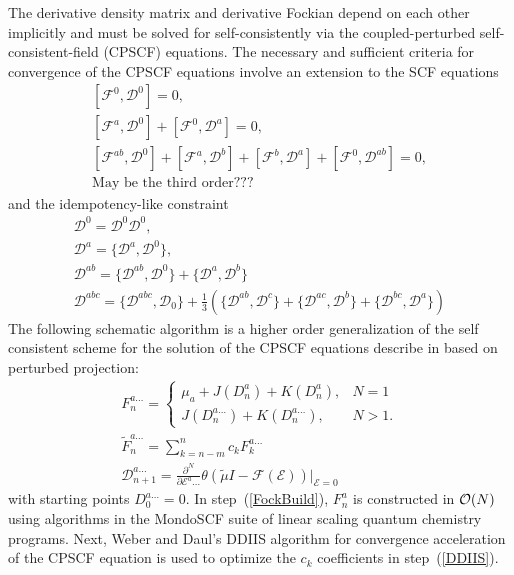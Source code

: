 \documentclass[prl,aps,twocolumn,showpacs,twocolumngrid,superbib]{revtex4}
\def\F{\mathcal{F}}
\def\D{\mathcal{D}}
\def\E{\mathcal{E}}
\begin{document}
The derivative density matrix and derivative Fockian depend on 
each other implicitly and must be solved for self-consistently 
via the coupled-perturbed self-consistent-field (CPSCF) equations.
The necessary and sufficient criteria for convergence of the 
CPSCF equations involve an extension to the SCF equations \cite{Furche_2001}
\begin{subequations}
  \begin{gather}
    [\F^{0} ,\D^{0}]=0,\\
    [\F^{a} ,\D^{0}]+[\F^{0},\D^{a}]=0,\\
    [\F^{ab},\D^{0}]+[\F^{a},\D^{b}]+[\F^{b} ,\D^{a}]+[\F^{0},\D^{ab}]=0,\\
    \text{May be the third order???}
  \end{gather}
\end{subequations}
and the idempotency-like constraint \cite{Furche_2001}
\begin{subequations}
  \begin{gather}
    \D^{0} =\D^{0} \D^{0},\\
    \D^{a} =\{\D^{a},\D^{0}\},\\
    \D^{ab}=\{\D^{ab},\D^{0}\}+\{\D^{a},\D^{b}\}\\
    \D^{abc}=\{\D^{abc},\D_0\}+
        \frac{1}{3}(\{\D^{ab},\D^{c}\}+\{\D^{ac},\D^{b}\}+\{\D^{bc},\D^{a}\})
  \end{gather}
\end{subequations}
The following schematic algorithm is a higher order generalization of the
self consistent scheme for the solution of the CPSCF equations describe 
in \cite{Weber04} based on perturbed projection:
\begin{subequations}
  \begin{gather}
F^{a\ldots}_{n}= \left\{
\begin{array}{ll}
\mu_a+J(D^{a}_n)+K(D^{a}_n), & N=1\label{FockBuild}\\
J(D^{a\ldots}_n)+K(D^{a\ldots}_n), & N>1.
\end{array}\right.\\
    \displaystyle\widetilde{F}^{a\ldots}_{n}=\sum_{k=n-m}^{n}c_k F^{a\ldots}_{k} \label{DDIIS} \\
    \displaystyle\D^{a\ldots}_{n+1}=
    \frac{\partial^N}{\partial\E^a\ldots}\theta(\tilde{\mu}I-
    \F(\E))\bigg|_{\E=0} \label{DDeriv}
  \end{gather} 
\end{subequations}
with starting points $D^{a\ldots}_0=0$. In step~(\ref{FockBuild}),  
$F^a_n$ is constructed in ${\cal O}(N)$ using algorithms 
\cite{MChallacombe97,ESchwegler97} in the {\sc MondoSCF} \cite{MondoSCF} 
suite of linear scaling quantum chemistry programs.  Next,
Weber and Daul's DDIIS algorithm for convergence acceleration 
of the CPSCF equation \cite{Weber_2003} is used to optimize 
the $c_k$ coefficients in step~(\ref{DDIIS}).
\end{document}
